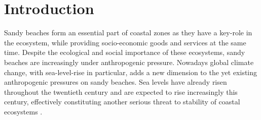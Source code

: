 \documentclass[format=sigconf, review=false, screen=true]{acmart}
\begin{document}





\maketitle



%



\section{Introduction}

Sandy beaches form an essential part of coastal zones as they have a key-role in the ecosystem, while providing socio-economic goods and services at the same time. Despite the ecological and social importance of these ecosystems, sandy beaches are increasingly under anthropogenic pressure. Nowadays global climate change, with sea-level-rise in particular, adds a new dimension to the yet existing anthropogenic pressures on sandy beaches\citep{Team2014ipcc}. Sea levels have already risen throughout the twentieth century and are expected to rise increasingly this century, effectively constituting another serious threat to stability of coastal ecosystems \citep{Nicholls2010sea}. 
\end{document}

